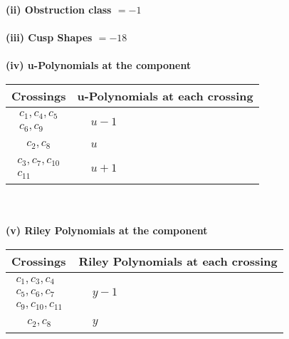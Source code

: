 \documentclass[1p]{elsarticle_modified}
\theoremstyle{definition}
\begin{document}
\flushleft \textbf{(ii) Obstruction class $= -1$}\\~\\
\flushleft \textbf{(iii) Cusp Shapes $= -18$}\\~\\
\newpage\renewcommand{\arraystretch}{1}
\flushleft \textbf{(iv) u-Polynomials at the component}\newline \\
\begin{tabular}{m{50pt}|m{274pt}}
Crossings & \hspace{64pt}u-Polynomials at each crossing \\
\hline $$\begin{aligned}c_{1},c_{4},c_{5}\\c_{6},c_{9}\end{aligned}$$&$\begin{aligned}
&u-1
\end{aligned}$\\
\hline $$\begin{aligned}c_{2},c_{8}\end{aligned}$$&$\begin{aligned}
&u
\end{aligned}$\\
\hline $$\begin{aligned}c_{3},c_{7},c_{10}\\c_{11}\end{aligned}$$&$\begin{aligned}
&u+1
\end{aligned}$\\
\hline
\end{tabular}\\~\\
\newpage\renewcommand{\arraystretch}{1}
\flushleft \textbf{(v) Riley Polynomials at the component}\newline \\
\begin{tabular}{m{50pt}|m{274pt}}
Crossings & \hspace{64pt}Riley Polynomials at each crossing \\
\hline $$\begin{aligned}c_{1},c_{3},c_{4}\\c_{5},c_{6},c_{7}\\c_{9},c_{10},c_{11}\end{aligned}$$&$\begin{aligned}
&y-1
\end{aligned}$\\
\hline $$\begin{aligned}c_{2},c_{8}\end{aligned}$$&$\begin{aligned}
&y
\end{aligned}$\\
\hline
\end{tabular}\\~\\
\end{document}
